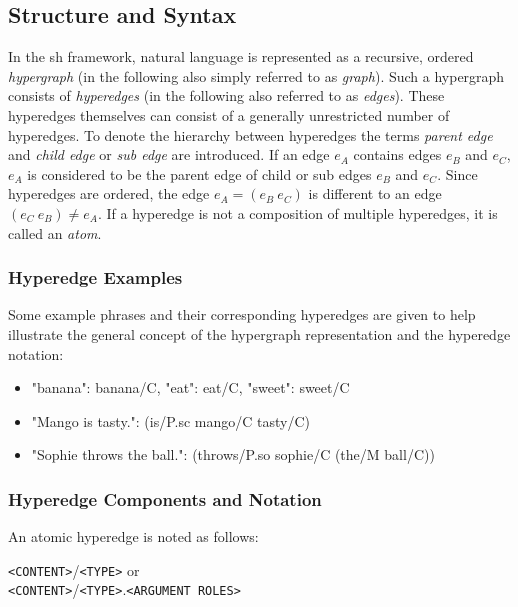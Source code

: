\documentclass[11pt]{scrreprt}
\begin{document}
\subsection{Structure and Syntax}
In the \gls{sh} framework, natural language is represented as a recursive, ordered \textit{hypergraph} (in the following also simply referred to as \textit{graph}). Such a hypergraph consists of \textit{hyperedges} (in the following also referred to as \textit{edges}). These hyperedges themselves can consist of a generally unrestricted number of hyperedges. To denote the hierarchy between hyperedges the terms \textit{parent edge} and \textit{child edge} or \textit{sub edge} are introduced. If an edge \(e_A\) contains edges \(e_B\) and \(e_C\), \(e_A\) is considered to be the parent edge of child or sub edges \(e_B\) and \(e_C\). Since hyperedges are ordered, the edge \(e_A = (e_B \ e_C)\) is different to an edge \((e_C \  e_B) \neq e_A\). If a hyperedge is not a composition of multiple hyperedges, it is called an \textit{atom}.


\subsubsection{Hyperedge Examples}
Some example phrases and their corresponding hyperedges are given to help illustrate the general concept of the hypergraph representation and the hyperedge notation:

\begin{itemize}
	\item "banana": \textsf{banana/C}, "eat": \textsf{eat/C}, "sweet": \textsf{sweet/C}
	\item "Mango is tasty.": \textsf{(is/P.sc mango/C tasty/C)}
	\item "Sophie throws the ball.": \textsf{(throws/P.so sophie/C (the/M ball/C))}
\end{itemize}


\subsubsection{Hyperedge Components and Notation}
\label{sec:hyperedge-notation}
An atomic hyperedge is noted as follows:

\begin{center}
	\texttt{<CONTENT>}\textsf{/}\texttt{<TYPE>} or \\
	\texttt{<CONTENT>}\textsf{/}\texttt{<TYPE>}\textsf{.}\texttt{<ARGUMENT ROLES>}
\end{center}
\end{document}
